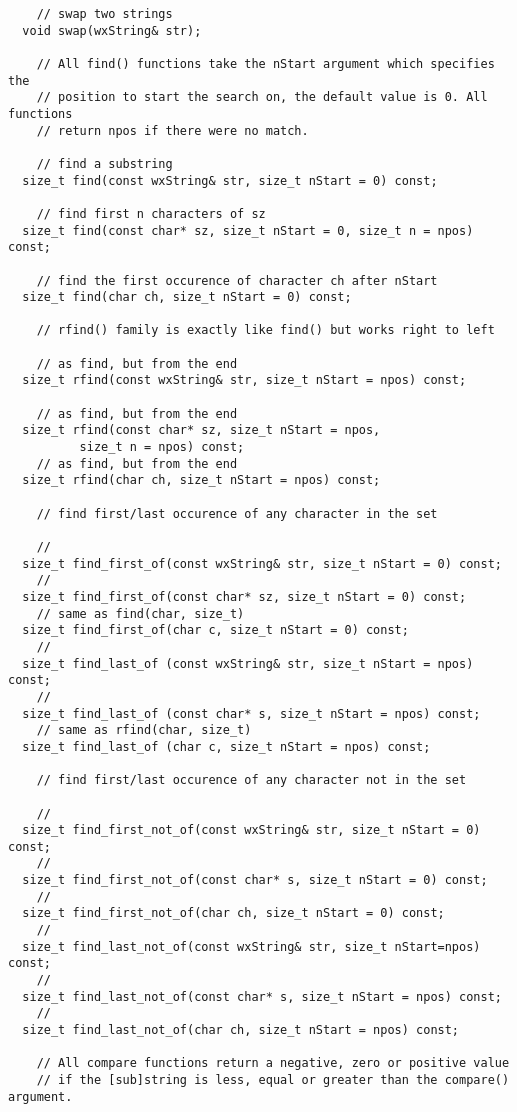 \begin{verbatim}
    // swap two strings
  void swap(wxString& str);

    // All find() functions take the nStart argument which specifies the
    // position to start the search on, the default value is 0. All functions
    // return npos if there were no match.

    // find a substring
  size_t find(const wxString& str, size_t nStart = 0) const;

    // find first n characters of sz
  size_t find(const char* sz, size_t nStart = 0, size_t n = npos) const;

    // find the first occurence of character ch after nStart
  size_t find(char ch, size_t nStart = 0) const;

    // rfind() family is exactly like find() but works right to left

    // as find, but from the end
  size_t rfind(const wxString& str, size_t nStart = npos) const;

    // as find, but from the end
  size_t rfind(const char* sz, size_t nStart = npos,
          size_t n = npos) const;
    // as find, but from the end
  size_t rfind(char ch, size_t nStart = npos) const;

    // find first/last occurence of any character in the set

    //
  size_t find_first_of(const wxString& str, size_t nStart = 0) const;
    //
  size_t find_first_of(const char* sz, size_t nStart = 0) const;
    // same as find(char, size_t)
  size_t find_first_of(char c, size_t nStart = 0) const;
    //
  size_t find_last_of (const wxString& str, size_t nStart = npos) const;
    //
  size_t find_last_of (const char* s, size_t nStart = npos) const;
    // same as rfind(char, size_t)
  size_t find_last_of (char c, size_t nStart = npos) const;

    // find first/last occurence of any character not in the set

    //
  size_t find_first_not_of(const wxString& str, size_t nStart = 0) const;
    //
  size_t find_first_not_of(const char* s, size_t nStart = 0) const;
    //
  size_t find_first_not_of(char ch, size_t nStart = 0) const;
    //
  size_t find_last_not_of(const wxString& str, size_t nStart=npos) const;
    //
  size_t find_last_not_of(const char* s, size_t nStart = npos) const;
    //
  size_t find_last_not_of(char ch, size_t nStart = npos) const;

    // All compare functions return a negative, zero or positive value
    // if the [sub]string is less, equal or greater than the compare() argument.


\end{verbatim}
